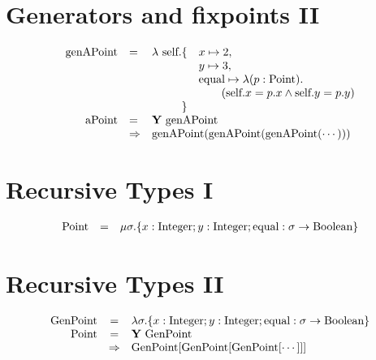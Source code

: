 \documentclass[12pt]{amsart}
\begin{document}
\section*{Generators and fixpoints II}
\newcommand{\Y}{\textbf{Y}}
\[
\begin{array}{rlrl}
\textrm{genAPoint} &=& \lambda~\self. \{ & x \mapsto 2,\\
&&& y \mapsto 3,\\
&&&\textrm{equal} \mapsto \lambda(p : \Point). \\
&&& \qquad (\self.x = p.x \wedge \self.y = p.y) \\
&&\} \\
\textrm{aPoint} &=& \multicolumn{2}{l}{\Y~\textrm{genAPoint}} \\
&\Rightarrow& \multicolumn{2}{l}{\textrm{genAPoint(genAPoint(genAPoint($\cdots$)))}}\\
\end{array}
\]
\newpage
\section*{Recursive Types I}
\newcommand{\GenPoint}{\textrm{GenPoint}}
\newcommand{\equal}{\textrm{equal}}
\[
\begin{array}{rcl}
\Point &=& \mu \sigma . \{ x : \Integer; y: \Integer; \equal : \sigma \rightarrow \Boolean \}
\end{array}
\]
\newpage
\section*{Recursive Types II}
\[
\begin{array}{rcl}
\GenPoint &=& \lambda \sigma . \{ x : \Integer; y: \Integer; \equal : \sigma \rightarrow \Boolean \} \\
\Point &=& \Y ~ \GenPoint \\
&\Rightarrow& \GenPoint[\GenPoint[\GenPoint[\cdots]]]
\end{array}
\]
\newpage
\end{document}

